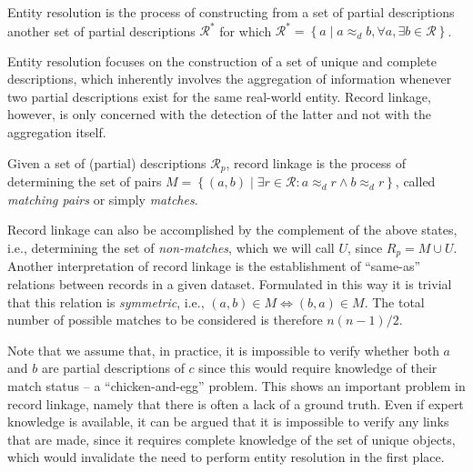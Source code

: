 \begin{definition}
    Entity resolution is the process of constructing from a set of partial descriptions another set of partial descriptions $\mathcal{R}^{*}$ for which $\mathcal{R}^{*} = \left\{ a \mid a \approx_{d} b, \forall{a}, \exists{b} \in \mathcal{R} \right\}$.
\end{definition}

\noindent Entity resolution focuses on the construction of a set of unique and complete descriptions, which inherently involves the aggregation of information whenever two partial descriptions exist for the same real-world entity.
Record linkage, however, is only concerned with the detection of the latter and not with the aggregation itself.

\begin{definition}
    Given a set of (partial) descriptions $\mathcal{R}_{p}$, record linkage is the process of determining the set of pairs $M = \left\{ (a, b) \mid \exists{r} \in \mathcal{R}: a \approx_{d} r \wedge b \approx_{d} r \right\}$, called \emph{matching pairs} or simply \emph{matches}.
\end{definition}

Record linkage can also be accomplished by the complement of the above states, i.e., determining the set of \emph{non-matches}, which we will call $U$, since $R_{p} = M \cup U$.
Another interpretation of record linkage is the establishment of ``same-as'' relations between records in a given dataset.
Formulated in this way it is trivial that this relation is \emph{symmetric}, i.e., $(a, b) \in M \Leftrightarrow (b, a) \in M$.
The total number of possible matches to be considered is therefore $n(n-1)/2$.

Note that we assume that, in practice, it is impossible to verify whether both $a$ and $b$ are partial descriptions of $c$ since this would require knowledge of their match status -- a ``chicken-and-egg'' problem.
This shows an important problem in record linkage, namely that there is often a lack of a ground truth.
Even if expert knowledge is available, it can be argued that it is impossible to verify any links that are made, since it requires complete knowledge of the set of unique objects, which would invalidate the need to perform entity resolution in the first place.

